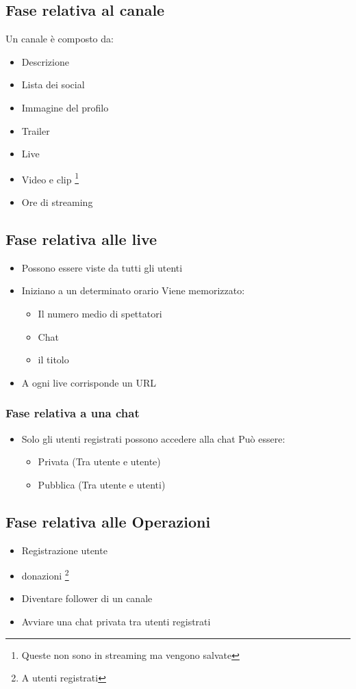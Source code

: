 \subsection{Fase relativa al canale}
Un canale è composto da:
\begin{itemize}
  \item Descrizione
  \item Lista dei social
  \item Immagine del profilo
  \item Trailer 
  \item Live 
  \item Video e clip \footnote{Queste non sono in streaming ma vengono salvate}
  \item Ore di streaming
\end{itemize}
\subsection{Fase relativa alle live}
\begin{itemize}
  \item Possono essere viste da tutti gli utenti
  \item Iniziano a un determinato orario
  Viene memorizzato:
    \begin{itemize}
      \item Il numero medio di spettatori
      \item Chat 
      \item il titolo
    \end{itemize}
    \item A ogni live corrisponde un URL
\end{itemize}
\subsubsection{Fase relativa a una chat}
\begin{itemize}
  \item Solo gli utenti registrati possono accedere alla chat
  Può essere:
  \begin{itemize}
    \item Privata (Tra utente e utente)
    \item Pubblica (Tra utente e utenti) 
  \end{itemize}
\end{itemize}
\subsection{Fase relativa alle Operazioni}
\begin{itemize}
  \item Registrazione utente
  \item donazioni \footnote{A utenti registrati}
  \item Diventare follower di un canale
  \item Avviare una chat privata tra utenti registrati
\end{itemize}
